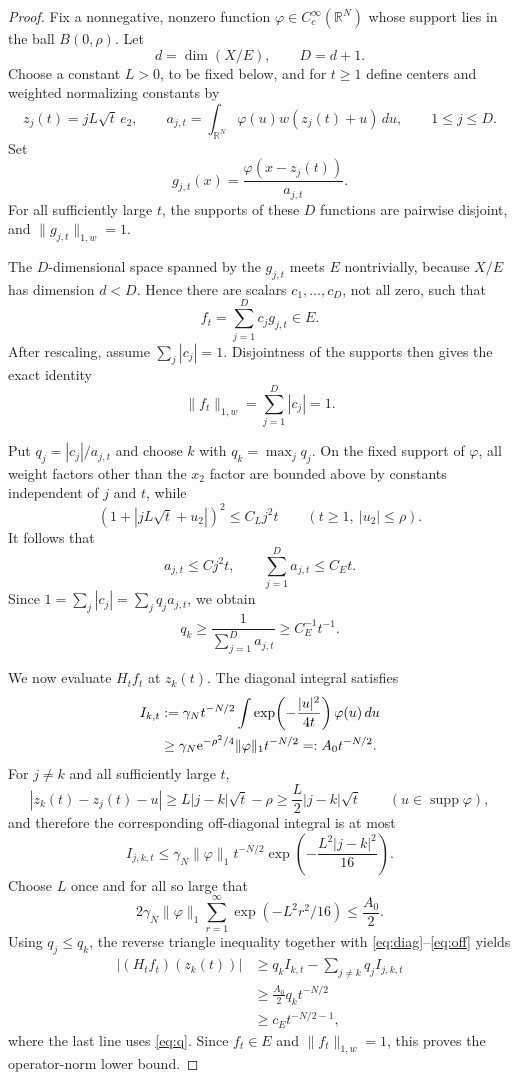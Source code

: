 \documentclass[11pt]{article}
\newcommand{\R}{\mathbb{R}}
\newcommand{\e}{\mathrm{e}}
\begin{document}
\begin{proof}
Fix a nonnegative, nonzero function
$\varphi\in C_c^\infty(\R^N)$ whose support lies in the ball
$B(0,\rho)$.  Let
\[
 d=\dim(X/E),\qquad D=d+1.
\]
Choose a constant $L>0$, to be fixed below, and for $t\ge1$ define centers
and weighted normalizing constants by
\[
 z_j(t)=jL\sqrt t\,e_2,
 \qquad
 a_{j,t}=\int_{\R^N}\varphi(u)w(z_j(t)+u)\,du,
 \qquad 1\le j\le D.
\]
Set
\[
 g_{j,t}(x)=\frac{\varphi(x-z_j(t))}{a_{j,t}}.
\]
For all sufficiently large $t$, the supports of these $D$ functions are
pairwise disjoint, and $\|g_{j,t}\|_{1,w}=1$.

The $D$-dimensional space spanned by the $g_{j,t}$ meets $E$ nontrivially,
because $X/E$ has dimension $d<D$.  Hence there are scalars $c_1,\ldots,c_D$,
not all zero, such that
\[
 f_t=\sum_{j=1}^{D}c_jg_{j,t}\in E.
\]
After rescaling, assume $\sum_j|c_j|=1$.  Disjointness of the supports then
gives the exact identity
\[
 \|f_t\|_{1,w}=\sum_{j=1}^{D}|c_j|=1.
\]

Put $q_j=|c_j|/a_{j,t}$ and choose $k$ with
$q_k=\max_jq_j$.  On the fixed support of $\varphi$, all weight factors other
than the $x_2$ factor are bounded above by constants independent of $j$ and
$t$, while
\[
 (1+|jL\sqrt t+u_2|)^2\le C_Lj^2t
 \qquad (t\ge1,\ |u_2|\le\rho).
\]
It follows that
\begin{equation}\label{eq:aj}
 a_{j,t}\le Cj^2t,
 \qquad
 \sum_{j=1}^{D}a_{j,t}\le C_Et.
\end{equation}
Since $1=\sum_j|c_j|=\sum_jq_ja_{j,t}$, we obtain
\begin{equation}\label{eq:q}
 q_k\ge \frac{1}{\sum_{j=1}^{D}a_{j,t}}
 \ge C_E^{-1}t^{-1}.
\end{equation}

We now evaluate $H_tf_t$ at $z_k(t)$.  The diagonal integral satisfies
\begin{align}
 I_{k,t}
 &:=\gamma_Nt^{-N/2}\int
 \exp\!\left(-\frac{|u|^2}{4t}\right)\varphi(u)\,du \notag\\
 &\ge \gamma_N\e^{-\rho^2/4}\|\varphi\|_1t^{-N/2}
 =:A_0t^{-N/2}.                                      \label{eq:diag}
\end{align}
For $j\ne k$ and all sufficiently large $t$,
\[
 |z_k(t)-z_j(t)-u|
 \ge L|j-k|\sqrt t-\rho
 \ge \frac L2|j-k|\sqrt t
 \qquad (u\in\operatorname{supp}\varphi),
\]
and therefore the corresponding off-diagonal integral is at most
\begin{equation}\label{eq:off}
 I_{j,k,t}
 \le \gamma_N\|\varphi\|_1t^{-N/2}
 \exp\!\left(-\frac{L^2|j-k|^2}{16}\right).
\end{equation}
Choose $L$ once and for all so large that
\[
 2\gamma_N\|\varphi\|_1
 \sum_{r=1}^{\infty}\exp(-L^2r^2/16)\le \frac{A_0}{2}.
\]
Using $q_j\le q_k$, the reverse triangle inequality together with
\eqref{eq:diag}--\eqref{eq:off} yields
\begin{align*}
 |(H_tf_t)(z_k(t))|
 &\ge q_k I_{k,t}-\sum_{j\ne k}q_jI_{j,k,t}\\
 &\ge \frac{A_0}{2}q_kt^{-N/2}\\
 &\ge c_Et^{-N/2-1},
\end{align*}
where the last line uses \eqref{eq:q}.  Since $f_t\in E$ and
$\|f_t\|_{1,w}=1$, this proves the operator-norm lower bound.


\end{proof}
\end{document}
